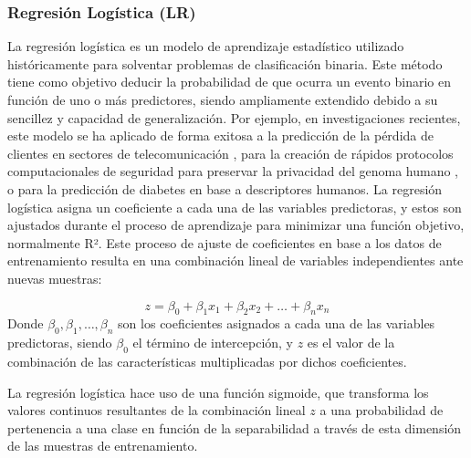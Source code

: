 \documentclass{uathesis-es}
\begin{document}
	
	
	
	
	
	
	
	\subsubsection*{Regresión Logística (LR)}
	
	
	
	La regresión logística es un modelo de aprendizaje estadístico utilizado históricamente para solventar problemas de clasificación binaria. Este método tiene como objetivo deducir la probabilidad de que ocurra un evento binario en función de uno o más predictores, siendo ampliamente extendido debido a su sencillez y capacidad de generalización. Por ejemplo, en investigaciones recientes, este modelo se ha aplicado de forma exitosa a la predicción de la pérdida de clientes en sectores de telecomunicación \cite{jain2020churn}, para la creación de rápidos protocolos computacionales de seguridad para preservar la privacidad del genoma humano \cite{de2021high}, o para la predicción de diabetes \cite{joshi2021predicting} en base a descriptores humanos. La regresión logística asigna un coeficiente a cada una de las variables predictoras, y estos son ajustados durante el proceso de aprendizaje para minimizar una función objetivo, normalmente R². Este proceso de ajuste de coeficientes en base a los datos de entrenamiento resulta en una combinación lineal de variables independientes ante nuevas muestras:
	
	\[
	z = \beta_0 + \beta_1 x_1 + \beta_2 x_2 + \dots + \beta_n x_n
	\]
	Donde $\beta_0, \beta_1, \dots, \beta_n$ son los coeficientes asignados a cada una de las variables predictoras, siendo $\beta_0$ el término de intercepción, y $z$ es el valor de la combinación de las características multiplicadas por dichos coeficientes.
	
	La regresión logística hace uso de una función sigmoide, que transforma los valores continuos resultantes de la combinación lineal $z$ a una probabilidad de pertenencia a una clase en función de la separabilidad a través de esta dimensión de las muestras de entrenamiento.
	
\end{document}
